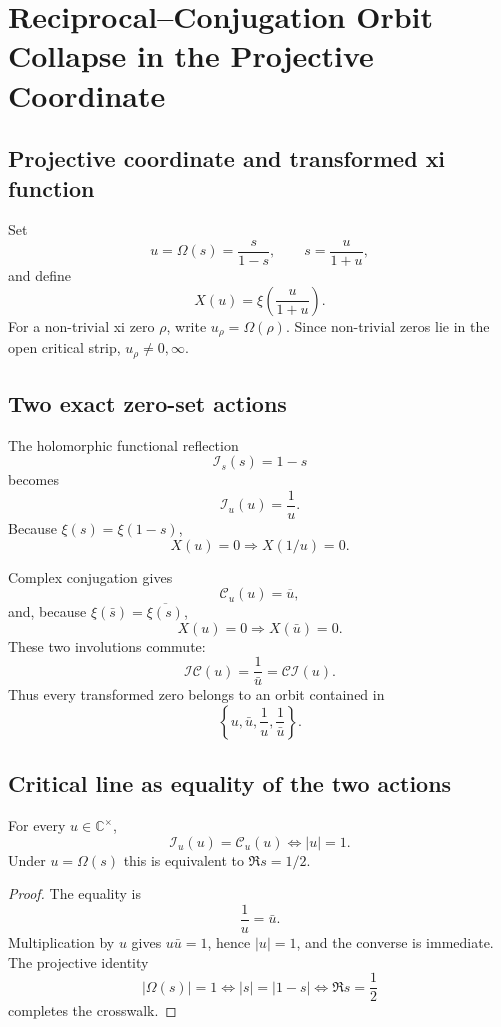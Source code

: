 \chapter{Reciprocal--Conjugation Orbit Collapse in the Projective Coordinate}
\label{chap:reciprocal-conjugation-orbit-collapse}


\section{Projective coordinate and transformed xi function}
Set
\[
u=\Omega(s)=\frac{s}{1-s},\qquad s=\frac{u}{1+u},
\]
and define
\[
X(u)=\xi\!\left(\frac{u}{1+u}\right).
\]
For a non-trivial xi zero $\rho$, write $u_\rho=\Omega(\rho)$. Since non-trivial zeros lie in the open critical strip, $u_\rho\ne0,\infty$.

\section{Two exact zero-set actions}
The holomorphic functional reflection
\[
\mathcal I_s(s)=1-s
\]
becomes
\[
\boxed{\mathcal I_u(u)=\frac1u.}
\]
Because $\xi(s)=\xi(1-s)$,
\[
X(u)=0\Longrightarrow X(1/u)=0.
\]

Complex conjugation gives
\[
\boxed{\mathcal C_u(u)=\overline u,}
\]
and, because $\xi(\bar s)=\overline{\xi(s)}$,
\[
X(u)=0\Longrightarrow X(\bar u)=0.
\]
These two involutions commute:
\[
\mathcal I\mathcal C(u)=\frac1{\bar u}
=\mathcal C\mathcal I(u).
\]
Thus every transformed zero belongs to an orbit contained in
\[
\boxed{\left\{u,\bar u,\frac1u,\frac1{\bar u}\right\}.}
\]

\section{Critical line as equality of the two actions}
\begin{theorem}
For every $u\in\mathbb C^\times$,
\[
\boxed{
\mathcal I_u(u)=\mathcal C_u(u)
\iff
|u|=1.
}
\]
Under $u=\Omega(s)$ this is equivalent to $\Re s=1/2$.
\end{theorem}

\begin{proof}
The equality is
\[
\frac1u=\bar u.
\]
Multiplication by $u$ gives $u\bar u=1$, hence $|u|=1$, and the converse is immediate. The projective identity
\[
|\Omega(s)|=1\iff |s|=|1-s|\iff\Re s=\frac12
\]
completes the crosswalk.
\end{proof}

